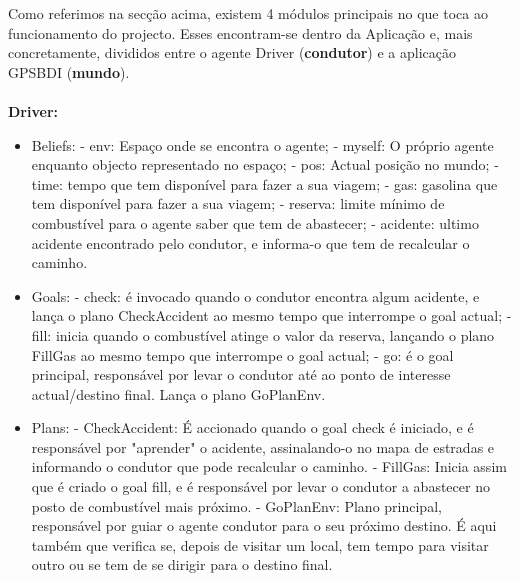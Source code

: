 \documentclass[15pt,a4paper]{article}
\begin{document}
Como referimos na secção acima, existem 4 módulos principais no que toca ao funcionamento do projecto. Esses encontram-se dentro da Aplicação e, mais concretamente, divididos entre o agente Driver (\textbf{condutor}) e a aplicação GPSBDI (\textbf{mundo}).\\\\ \textbf{Driver:}
\begin{itemize}
\item Beliefs:
\subitem - env: Espaço onde se encontra o agente;
\subitem - myself: O próprio agente enquanto objecto representado no espaço;
\subitem - pos: Actual posição no mundo;
\subitem - time: tempo que tem disponível para fazer a sua viagem;
\subitem - gas: gasolina que tem disponível para fazer a sua viagem;
\subitem - reserva: limite mínimo de combustível para o agente saber que tem de abastecer;
\subitem - acidente: ultimo acidente encontrado pelo condutor, e informa-o que tem de recalcular o caminho.
\item Goals:
\subitem - check: é invocado quando o condutor encontra algum acidente, e lança o plano CheckAccident ao mesmo tempo que interrompe o goal actual;
\subitem - fill: inicia quando o combustível atinge o valor da reserva, lançando o plano FillGas ao mesmo tempo que interrompe o goal actual;
\subitem - go: é o goal principal, responsável por levar o condutor até ao ponto de interesse actual/destino final. Lança o plano GoPlanEnv.
\item Plans:
\subitem - CheckAccident: É accionado quando o goal check é iniciado, e é responsável por "aprender" o acidente, assinalando-o no mapa de estradas e informando o condutor que pode recalcular o caminho.
\subitem - FillGas: Inicia assim que é criado o goal fill, e é responsável por levar o condutor a abastecer no posto de combustível mais próximo.
\subitem - GoPlanEnv: Plano principal, responsável por guiar o agente condutor para o seu próximo destino. É aqui também que verifica se, depois de visitar um local, tem tempo para visitar outro ou se tem de se dirigir para o destino final.\\\\
\end{itemize}
\end{document}
